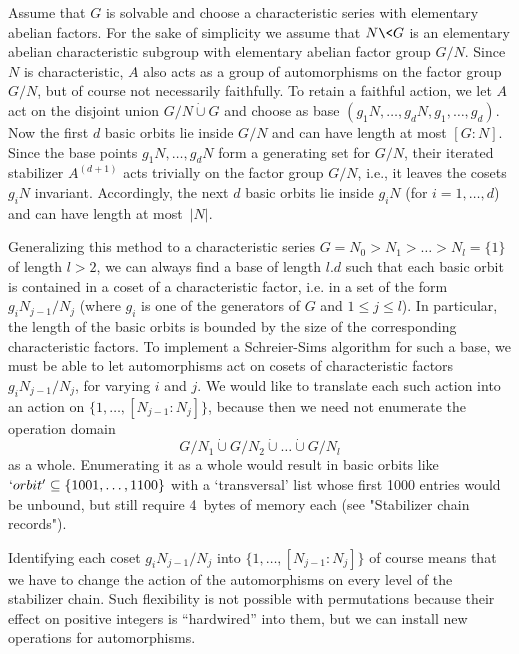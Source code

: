 Assume that   $G$ is solvable  and  choose  a  characteristic series with
elementary abelian factors. For the sake of  simplicity we assume that $N
\< G$ is an   elementary abelian characteristic subgroup  with elementary
abelian factor group $G/N$. Since $N$ is characteristic, $A$ also acts as
a group of automorphisms  on the factor  group $G/N$,  but of course  not
necessarily  faithfully. To retain  a faithful action,  we let $A$ act on
the disjoint  union  $G/N   \mathbin{\dot\cup} G$  and  choose  as   base
$(g_1N,\ldots,g_dN,g_1,\ldots,g_d)$.  Now the first  $d$ basic orbits lie
inside $G/N$ and can have length at  most $[G\mathbin:N]$. Since the base
points  $g_1N,\ldots,  g_dN$  form a  generating   set  for  $G/N$, their
iterated stabilizer $A^{(d+1)}$ acts trivially on the factor group $G/N$,
i.e., it leaves  the cosets $g_iN$  invariant. Accordingly,  the next $d$
basic orbits lie inside  $g_iN$ (for $i=1,\ldots,d$)  and can have length
at most~$|N|$.

Generalizing this method to a characteristic series $G=N_0 > N_1 > \ldots
> N_l=\{1\}$ of length $l>2$, we  can always find  a base of length $l.d$
such that each  basic orbit is  contained in a  coset of a characteristic
factor, i.e. in a set of the form $g_iN_{j-1}/N_j$ (where $g_i$ is one of
the generators  of $G$ and $1\le j\le  l$). In particular, the  length of
the basic  orbits   is  bounded   by  the  size  of    the  corresponding
characteristic factors. To implement a Schreier-Sims algorithm for such a
base, we  must  be   able  to  let   automorphisms  act  on   cosets   of
characteristic  factors $g_iN_{j-1}/N_j$, for  varying  $i$  and $j$.  We
would    like to    translate each such     action  into  an  action   on
$\{1,\ldots,[N_{j-1}\mathbin: N_j]\}$, because then we need not enumerate
the operation domain
$$ G/N_1 \mathbin{\dot\cup} G/N_2 \mathbin{\dot\cup} \ldots
         \mathbin{\dot\cup} G/N_l $$
as a whole. Enumerating it  as a whole would result  in basic orbits like
$`orbit'\subseteq \{1001,\ldots,1100\}$  with a  `transversal' list whose
first 1000 entries would be unbound, but  still require 4~bytes of memory
each (see "Stabilizer chain records").

Identifying   each  coset   $g_iN_{j-1}/N_j$ into   $\{1,\ldots, [N_{j-1}
\mathbin: N_j]\}$ of  course means that we have  to change the action  of
the automorphisms on     every  level of   the  stabilizer   chain.  Such
flexibility is not   possible with permutations  because their  effect on
positive  integers  is ``hardwired''  into them,  but  we can install new
operations for automorphisms.

